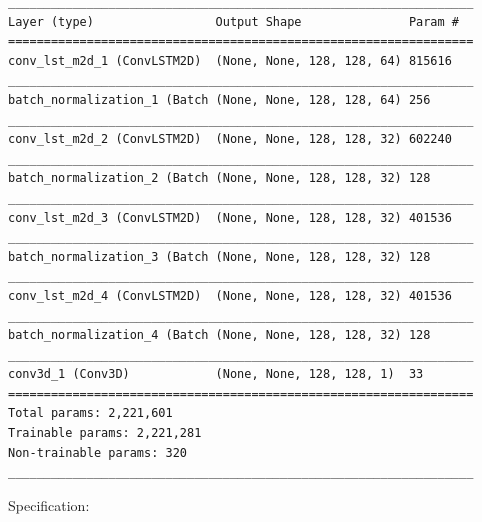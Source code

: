 \begin{verbatim}
_________________________________________________________________
Layer (type)                 Output Shape               Param #   
=================================================================
conv_lst_m2d_1 (ConvLSTM2D)  (None, None, 128, 128, 64) 815616    
_________________________________________________________________
batch_normalization_1 (Batch (None, None, 128, 128, 64) 256       
_________________________________________________________________
conv_lst_m2d_2 (ConvLSTM2D)  (None, None, 128, 128, 32) 602240    
_________________________________________________________________
batch_normalization_2 (Batch (None, None, 128, 128, 32) 128       
_________________________________________________________________
conv_lst_m2d_3 (ConvLSTM2D)  (None, None, 128, 128, 32) 401536    
_________________________________________________________________
batch_normalization_3 (Batch (None, None, 128, 128, 32) 128       
_________________________________________________________________
conv_lst_m2d_4 (ConvLSTM2D)  (None, None, 128, 128, 32) 401536    
_________________________________________________________________
batch_normalization_4 (Batch (None, None, 128, 128, 32) 128       
_________________________________________________________________
conv3d_1 (Conv3D)            (None, None, 128, 128, 1)  33        
=================================================================
Total params: 2,221,601
Trainable params: 2,221,281
Non-trainable params: 320
_________________________________________________________________
\end{verbatim}

Specification:


